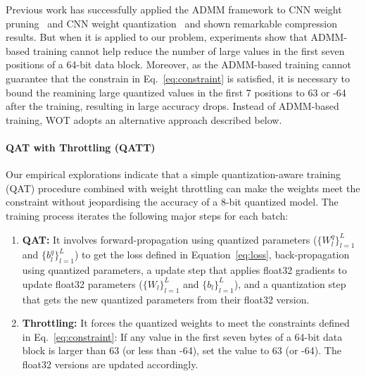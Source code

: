 \documentclass{article}
\begin{document}
Previous work has successfully applied the ADMM framework to CNN weight pruning~\cite{zhang2018systematic} and CNN weight quantization~\cite{ren2019admm} and shown remarkable compression results. 
But when it is applied to our problem, experiments show that ADMM-based training cannot help reduce the number of large values in the first seven positions of a 64-bit data block. Moreover, as the ADMM-based training cannot guarantee that the constrain in Eq.~\ref{eq:constraint} is satisfied, it is necessary to bound the reamining large quantized values in the first 7 positions to 63 or -64 after the training, resulting in large accuracy drops.  Instead of ADMM-based training, WOT adopts an alternative approach described below. 


\paragraph{QAT with Throttling (QATT)} Our empirical explorations indicate that a simple quantization-aware training (QAT) procedure combined with weight throttling can  make the weights meet the constraint without jeopardising the accuracy of a 8-bit quantized model. The training process iterates the following major steps for each batch:
\begin{enumerate}
    
    \item \textbf{QAT:} It involves forward-propagation using quantized parameters ($\{W_l^{q}\}_{l=1}^L$ and $\{b_l^{q}\}_{l=1}^L$) to get the loss defined in Equation~\ref{eq:loss}, back-propagation using quantized parameters, a update step that applies float32 gradients to update float32 parameters ($\{W_l\}_{l=1}^L$ and $\{b_l\}_{l=1}^L$), and a quantization step that gets the new quantized parameters from their float32 version.  
    
    \item \textbf{Throttling:} It forces the quantized weights to meet the constraints defined in Eq.~\ref{eq:constraint}: If any value in the first seven bytes of a 64-bit data block is larger than 63 (or less than -64), set the value to 63 (or -64). The float32 versions are updated accordingly.
     
\end{enumerate}
\end{document}
